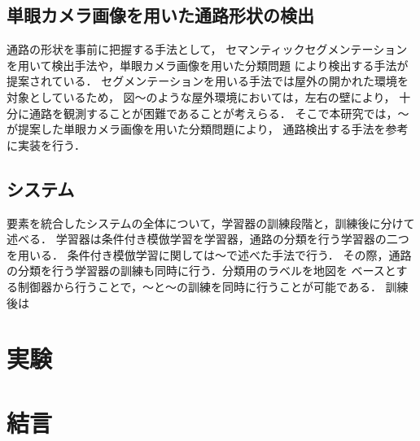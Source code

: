 \documentclass{jarticle}
\begin{document}
\subsection{単眼カメラ画像を用いた通路形状の検出}
通路の形状を事前に把握する手法として，
セマンティックセグメンテーションを用いて検出手法や，単眼カメラ画像を用いた分類問題
により検出する手法が提案されている．
セグメンテーションを用いる手法では屋外の開かれた環境を対象としているため，
図〜のような屋外環境においては，左右の壁により，
十分に通路を観測することが困難であることが考えらる．
そこで本研究では，〜が提案した単眼カメラ画像を用いた分類問題により，
通路検出する手法を参考に実装を行う．
\subsection{システム}
要素を統合したシステムの全体について，学習器の訓練段階と，訓練後に分けて述べる．
学習器は条件付き模倣学習を学習器，通路の分類を行う学習器の二つを用いる．
条件付き模倣学習に関しては〜で述べた手法で行う．
その際，通路の分類を行う学習器の訓練も同時に行う．分類用のラベルを地図を
ベースとする制御器から行うことで，〜と〜の訓練を同時に行うことが可能である．
訓練後は

\section{実験}
\section{結言}

\end{document}
